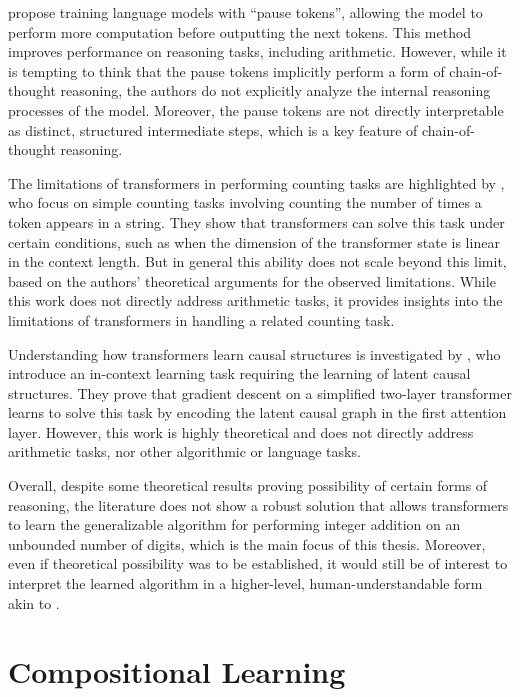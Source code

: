 \cite{goyal_think_2024} propose training language models with ``pause tokens'', allowing the model to perform more computation before outputting the next tokens. This method improves performance on reasoning tasks, including arithmetic. However, while it is tempting to think that the pause tokens implicitly perform a form of chain-of-thought reasoning, the authors do not explicitly analyze the internal reasoning processes of the model. Moreover, the pause tokens are not directly interpretable as distinct, structured intermediate steps, which is a key feature of chain-of-thought reasoning.

The limitations of transformers in performing counting tasks are highlighted by \cite{yehudai_when_2024}, who focus on simple counting tasks involving counting the number of times a token appears in a string. They show that transformers can solve this task under certain conditions, such as when the dimension of the transformer state is linear in the context length. But in general this ability does not scale beyond this limit, based on the authors' theoretical arguments for the observed limitations. While this work does not directly address arithmetic tasks, it provides insights into the limitations of transformers in handling a related counting task.

Understanding how transformers learn causal structures is investigated by \cite{nichani_how_2024}, who introduce an in-context learning task requiring the learning of latent causal structures. They prove that gradient descent on a simplified two-layer transformer learns to solve this task by encoding the latent causal graph in the first attention layer. However, this work is highly theoretical and does not directly address arithmetic tasks, nor other algorithmic or language tasks.

Overall, despite some theoretical results proving possibility of certain forms of reasoning, the literature does not show a robust solution that allows transformers to learn the generalizable algorithm for performing integer addition on an unbounded number of digits, which is the main focus of this thesis. Moreover, even if theoretical possibility was to be established, it would still be of interest to interpret the learned algorithm in a higher-level, human-understandable form akin to \cite{nanda_progress_2022}.

\section{Compositional Learning}\label{sec:sota_compositional_learning}

